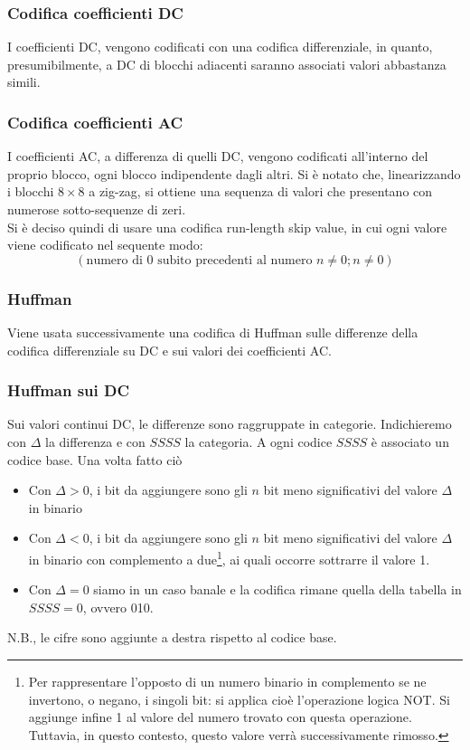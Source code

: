 \documentclass{report}
\begin{document}
	\subsubsection{Codifica coefficienti DC}
	I coefficienti DC, vengono codificati con una codifica differenziale, in quanto, presumibilmente, a DC di blocchi adiacenti saranno associati valori abbastanza simili.
	
	\subsubsection{Codifica coefficienti AC}
	I coefficienti AC, a differenza di quelli DC, vengono codificati all'interno del proprio blocco, ogni blocco indipendente dagli altri. Si è notato che, linearizzando i blocchi $8\times8$ a zig-zag, si ottiene una sequenza di valori che presentano con numerose sotto-sequenze di zeri.\\
	Si è deciso quindi di usare una codifica run-length skip value, in cui ogni valore viene codificato nel sequente modo:
	$$
	( \text{numero di 0 subito precedenti al numero } n \neq 0; n\neq 0)
	$$
	
	\newpage
	\subsubsection{Huffman}
	Viene usata successivamente una codifica di Huffman sulle differenze della codifica differenziale su DC e sui valori dei coefficienti AC.
	
	\subsubsection{Huffman sui DC}
	Sui valori continui DC, le differenze sono raggruppate in categorie. Indichieremo con $\Delta$ la differenza e con $SSSS$ la categoria. 
	A ogni codice $SSSS$ è associato un codice base. Una volta fatto ciò
	\begin{itemize}
		\item Con $\Delta>0$, i bit da aggiungere sono gli $n$ bit meno significativi del valore $\Delta$ in binario
		\item Con $\Delta<0$, i bit da aggiungere sono gli $n$ bit meno significativi del valore $\Delta$ in binario con complemento a due\footnote{Per rappresentare l'opposto di un numero binario in complemento se ne invertono, o negano, i singoli bit: si applica cioè l'operazione logica NOT. Si aggiunge infine 1 al valore del numero trovato con questa operazione. Tuttavia, in questo contesto, questo valore verrà successivamente rimosso.}, ai quali occorre sottrarre il valore 1.
		\item Con $\Delta=0$ siamo in un caso banale e la codifica rimane quella della tabella in $SSSS=0$, ovvero 010.
		          
	\end{itemize}
	N.B., le cifre sono aggiunte a destra rispetto al codice base.
	
\end{document}
